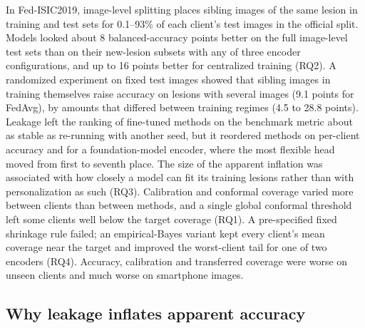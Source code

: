 \documentclass[VANCOUVER,Times1COL]{WileyNJDv5}
\begin{document}
In Fed-ISIC2019, image-level splitting places sibling images of the same lesion in training and test sets
for 0.1--93\% of each client's test images in the official split. Models looked about 8 balanced-accuracy
points better on the full image-level test sets than on their new-lesion subsets with any of three encoder
configurations, and up to 16 points better for centralized training (RQ2). A randomized experiment on fixed test images showed that sibling images in training themselves raise
accuracy on lesions with several images (9.1 points for FedAvg), by amounts that differed between training
regimes (4.5 to 28.8 points). Leakage left the
ranking of fine-tuned methods on the benchmark metric about as stable as re-running with another seed, but
it reordered methods on per-client accuracy and for a foundation-model encoder, where the most flexible
head moved from first to seventh place. The size of the apparent inflation was associated with how closely
a model can fit its training lesions rather than with personalization as such (RQ3). Calibration and
conformal coverage varied more between clients than between methods, and a single global conformal
threshold left some clients well below the target coverage (RQ1). A pre-specified fixed shrinkage rule
failed; an empirical-Bayes variant kept every client's mean coverage near the target and improved the
worst-client tail for one of two encoders (RQ4). Accuracy, calibration and transferred coverage were worse
on unseen clients and much worse on smartphone images.

\subsection{Why leakage inflates apparent accuracy}
\end{document}
